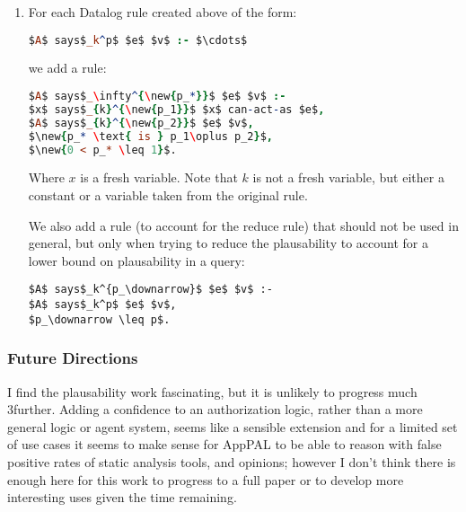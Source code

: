 \documentclass[a4paper]{scrartcl}
\newcommand{\new}[1]{{\color{BrickRed}#1}}
\begin{document}
\begin{enumerate}
\begin{enumerate}
  \item
    For each $i\in\left\{1\cdots n\right\}$, we add a Datalog rule
    \begin{lstlisting}[language=Prolog]
$A$ says$_\infty^{\new{p_*}}$ $f^\prime_i$ :-
$x$ says$_{D_{i-1}}^{\new{p_1}}$ $f^\prime_i$,
$A$ says$_{\infty}^{\new{p_2}}$ $x$ can-say $D_{i-1}$ $f^\prime_i$,
$\new{p_* \text{ is } p_1\oplus p_2}$,
$\new{0 < p_* \leq 1}$.
    \end{lstlisting}
    Where $x$ is a fresh variable.
  \end{enumerate}

\item
  For each Datalog rule created above of the form:
  \begin{lstlisting}[language=Prolog]
$A$ says$_k^p$ $e$ $v$ :- $\cdots$
  \end{lstlisting}
  we add a rule:

  \begin{lstlisting}[language=Prolog]
$A$ says$_\infty^{\new{p_*}}$ $e$ $v$ :-
$x$ says$_{k}^{\new{p_1}}$ $x$ can-act-as $e$,
$A$ says$_{k}^{\new{p_2}}$ $e$ $v$,
$\new{p_* \text{ is } p_1\oplus p_2}$,
$\new{0 < p_* \leq 1}$.
  \end{lstlisting}
  Where $x$ is a fresh variable.  Note that $k$ is not a fresh variable, but either a constant or a variable taken from the original rule.


  \new{
    We also add a rule (to account for the reduce rule)
    that should not be used in general, but only when trying to reduce the
    plausability to account for a lower bound on plausability in a query:
  }

  \begin{lstlisting}[basicstyle=\color{BrickRed}\ttfamily]
$A$ says$_k^{p_\downarrow}$ $e$ $v$ :-
$A$ says$_k^p$ $e$ $v$,
$p_\downarrow \leq p$.
  \end{lstlisting}
\end{enumerate}

\subsubsection*{Future Directions}

I find the plausability work fascinating, but it is unlikely to progress much
3further.  Adding a confidence to an authorization logic, rather than a more
general logic or agent system, seems like a sensible extension and for a limited
set of use cases it seems to make sense for AppPAL to be able to reason with false
positive rates of static analysis tools, and opinions; however I don't think
there is enough here for this work to progress to a full paper or to develop
more interesting uses given the time remaining.
\end{document}
